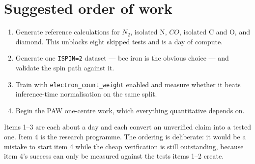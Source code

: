 \documentclass[11pt,a4paper]{report}
\newcommand{\opt}[1]{\texttt{#1}}
\begin{document}
\section{Suggested order of work}

\begin{enumerate}
\item Generate reference calculations for $N_2$, isolated N, $CO$, isolated C
  and O, and diamond. This unblocks eight skipped tests and is a day of
  compute.
\item Generate one \opt{ISPIN=2} dataset --- bcc iron is the obvious choice ---
  and validate the spin path against it.
\item Train with \opt{electron\_count\_weight} enabled and measure whether it
  beats inference-time normalisation on the same split.
\item Begin the PAW one-centre work, which everything quantitative depends on.
\end{enumerate}

\begin{pnote}
Items 1--3 are each about a day and each convert an unverified claim into a
tested one. Item 4 is the research programme. The ordering is deliberate: it
would be a mistake to start item 4 while the cheap verification is still
outstanding, because item 4's success can only be measured against the tests
items 1--2 create.
\end{pnote}
\end{document}
